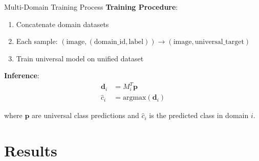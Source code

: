 \documentclass[aspectratio=169]{beamer}
\begin{document}
\begin{frame}{Multi-Domain Training Process}
    \textbf{Training Procedure}:
    \begin{enumerate}
        \item Concatenate domain datasets
        \item Each sample: $(\text{image}, (\text{domain\_id}, \text{label})) \rightarrow (\text{image}, \text{universal\_target})$
        \item Train universal model on unified dataset
    \end{enumerate}

    \vspace{1em}

    \textbf{Inference}:
    \begin{align}
        \mathbf{d}_i & = M_i^T \mathbf{p}            \\
        \hat{c}_i    & = \text{argmax}(\mathbf{d}_i)
    \end{align}

    where $\mathbf{p}$ are universal class predictions and $\hat{c}_i$ is the predicted class in domain $i$.
\end{frame}

\section{Results}
\end{document}
